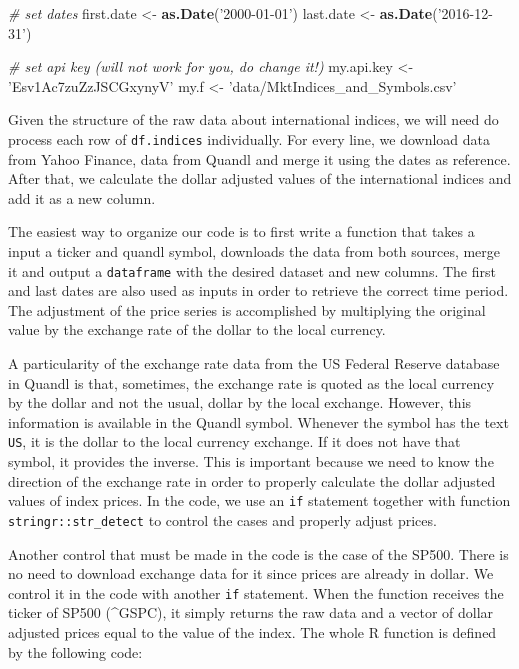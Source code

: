 \documentclass[11pt,]{book}
\newenvironment{Shaded}{\begin{snugshade}}{\end{snugshade}}
\newcommand{\KeywordTok}[1]{\textcolor[rgb]{0.27,0.27,0.27}{\textbf{#1}}}
\newcommand{\StringTok}[1]{\textcolor[rgb]{0.5,0.5,0.5}{#1}}
\newcommand{\CommentTok}[1]{\textcolor[rgb]{0.56,0.35,0.01}{\textit{#1}}}
\newcommand{\NormalTok}[1]{#1}
\begin{document}
\begin{Shaded}
\begin{Highlighting}[]
\CommentTok{# set dates}
\NormalTok{first.date <-}\StringTok{ }\KeywordTok{as.Date}\NormalTok{(}\StringTok{'2000-01-01'}\NormalTok{)}
\NormalTok{last.date <-}\StringTok{ }\KeywordTok{as.Date}\NormalTok{(}\StringTok{'2016-12-31'}\NormalTok{)}

\CommentTok{# set api key (will not work for you, do change it!)}
\NormalTok{my.api.key <-}\StringTok{ 'Esv1Ac7zuZzJSCGxynyV'} 
\NormalTok{my.f <-}\StringTok{ 'data/MktIndices_and_Symbols.csv'}
\end{Highlighting}
\end{Shaded}

Given the structure of the raw data about international indices, we will
need do process each row of \texttt{df.indices} individually. For every
line, we download data from Yahoo Finance, data from Quandl and merge it
using the dates as reference. After that, we calculate the dollar
adjusted values of the international indices and add it as a new column.

The easiest way to organize our code is to first write a function that
takes a input a ticker and quandl symbol, downloads the data from both
sources, merge it and output a \texttt{dataframe} with the desired
dataset and new columns. The first and last dates are also used as
inputs in order to retrieve the correct time period. The adjustment of
the price series is accomplished by multiplying the original value by
the exchange rate of the dollar to the local currency.

A particularity of the exchange rate data from the US Federal Reserve
database in Quandl is that, sometimes, the exchange rate is quoted as
the local currency by the dollar and not the usual, dollar by the local
exchange. However, this information is available in the Quandl symbol.
Whenever the symbol has the text \texttt{US}, it is the dollar to the
local currency exchange. If it does not have that symbol, it provides
the inverse. This is important because we need to know the direction of
the exchange rate in order to properly calculate the dollar adjusted
values of index prices. In the code, we use an \texttt{if} statement
together with function \texttt{stringr::str\_detect} to control the
cases and properly adjust prices.

Another control that must be made in the code is the case of the SP500.
There is no need to download exchange data for it since prices are
already in dollar. We control it in the code with another \texttt{if}
statement. When the function receives the ticker of SP500 (\^{}GSPC), it
simply returns the raw data and a vector of dollar adjusted prices equal
to the value of the index. The whole R function is defined by the
following code:
\end{document}
